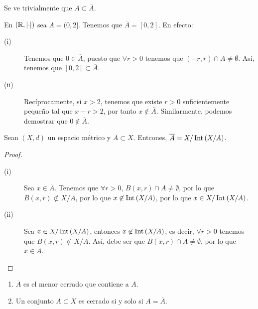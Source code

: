 \begin{observation}
Se ve trivialmente que $\displaystyle A \subset \overline{A} $.
\end{observation}
\begin{eg}
	En $\displaystyle \left(\mathbb{R}, \left| \cdot \right|\right) $ sea $\displaystyle A = (0,2] $. Tenemos que $\displaystyle \overline{A} = \left[0,2\right]  $. En efecto:
	\begin{description}
	\item[(i)] Tenemos que $\displaystyle 0 \in \overline{A} $, puesto que $\displaystyle \forall r > 0 $ tenemos que $\displaystyle \left(-r,r\right) \cap A \neq \emptyset $. Así, tenemos que $\displaystyle \left[0,2\right] \subset \overline{A} $.
	\item[(ii)] Recíprocamente, si $\displaystyle x > 2 $, tenemos que existe $\displaystyle r > 0 $ suficientemente pequeño tal que $\displaystyle x - r > 2 $, por tanto $\displaystyle x \not\in \overline{A} $. Similarmente, podemos demostrar que $\displaystyle 0 \not\in \overline{A} $.
	\end{description}
\end{eg}
\begin{lema}
Sean $\displaystyle \left(X,d\right) $ un espacio métrico y $\displaystyle A \subset X $. Entcones, $\displaystyle \overline{A} = X/\operatorname{Int}\left(X/A\right) $.
\end{lema}
\begin{proof}
\begin{description}
\item[(i)] Sea $\displaystyle x \in \overline{A} $. Tenemos que $\displaystyle \forall r > 0 $, $\displaystyle B\left(x,r\right) \cap A \neq \emptyset $, por lo que $\displaystyle B\left(x,r\right) \not \subset X/A $, por lo que $\displaystyle x \not\in \operatorname{Int}\left(X/A\right) $, por lo que $\displaystyle x \in X/\operatorname{Int}\left(X/A\right) $.
\item[(ii)] Sea $\displaystyle x \in X/\operatorname{Int}\left(X/A\right) $, entonces $\displaystyle x \not\in \operatorname{Int}\left(X/A\right) $, es decir, $\displaystyle \forall r > 0 $ tenemos que $\displaystyle B\left(x,r\right) \not \subset X/A $. Así, debe ser que $\displaystyle B\left(x,r\right) \cap A \neq \emptyset $, por lo que $\displaystyle x \in \overline{A} $.
\end{description}
\end{proof}
\begin{prop}
\begin{enumerate}
\item $\displaystyle \overline{A} $ es el menor cerrado que contiene a $\displaystyle A $.
\item Un conjunto $\displaystyle A \subset X $ es cerrado si y solo si $\displaystyle A = \overline{A} $.
\end{enumerate}
\end{prop}
